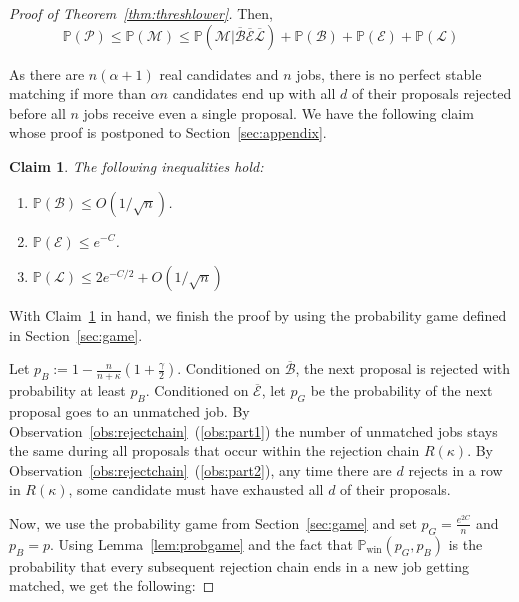\documentclass[11pt]{amsart}
\newtheorem{claim}[theorem]{Claim}
\newcommand{\cal}[1]{\mathcal{#1}}
\begin{document}
\begin{proof}[Proof of Theorem~\ref{thm:threshlower}]
Then, 
\begin{equation}\label{eqn:lowerboundmain}
    \mathbb{P}(\mathcal{P}) \leq \mathbb{P}(\mathcal{M}) \leq \mathbb{P}(\mathcal{M} | \overline{\mathcal{B}} \overline{\mathcal{E}}\overline{\mathcal{L}}) + \mathbb{P}(\mathcal{B}) + \mathbb{P}(\mathcal{E}) + \mathbb{P}(\mathcal{L})
\end{equation}




As there are $n (\alpha +1)$ real candidates and $n$ jobs, there is no perfect stable matching if more than $\alpha n$ candidates end up with all $d$ of their proposals rejected before all $n$ jobs receive even a single proposal. We have the following claim whose proof is postponed to Section~\ref{sec:appendix}. 

\begin{claim}\label{claim:probbounds}
The following inequalities hold:
\begin{enumerate}
\item\label{probb} $\mathbb{P}(\mathcal{B}) \leq O(1/\sqrt{n})$.
\item\label{probe} $\mathbb{P}(\mathcal{E}) \leq e^{-C}$.
\item\label{probl} $\mathbb{P}(\mathcal{L}) \leq 2e^{-C/2} + O(1/\sqrt{n})$
\end{enumerate}
\end{claim}






With Claim~\ref{claim:probbounds} in hand, we finish the proof by using the probability game defined in Section~\ref{sec:game}.  

Let $p_B := 1 - \frac{n}{n+\kappa}(1+ \frac \gamma 2)$. Conditioned on $\overline{\cal{B}}$, the next proposal is rejected with probability at least $p_B$. Conditioned on $\overline{\mathcal{E}}$, let $p_G$ be the probability of the next proposal goes to an unmatched job. By Observation~\ref{obs:rejectchain}~(\ref{obs:part1}) the number of unmatched jobs stays the same during all proposals that occur within the rejection chain $R(\kappa)$.  
By Observation~\ref{obs:rejectchain}~(\ref{obs:part2}), any time there are $d$ rejects in a row in $R(\kappa)$, some candidate must have exhausted all $d$ of their proposals. 

Now, we use the probability game from Section~\ref{sec:game} and set $p_G = \frac{e^{2C}}{n}$ and $p_B =p$. 
Using Lemma~\ref{lem:probgame} and the fact that $\mathbb{P}_{\text{win}}(p_G, p_B)$ is the probability that every subsequent rejection chain ends in a new job getting matched, we get the following:



\end{proof}
\end{document}
